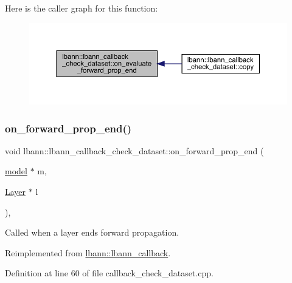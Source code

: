 Here is the caller graph for this function\+:\nopagebreak
\begin{figure}[H]
\begin{center}
\leavevmode
\includegraphics[width=350pt]{classlbann_1_1lbann__callback__check__dataset_a1223f07081d495d971cdf205f892c50d_icgraph}
\end{center}
\end{figure}
\mbox{\label{classlbann_1_1lbann__callback__check__dataset_acedc222fc108c156d089f1baa8c040af}} 
\subsubsection{\texorpdfstring{on\+\_\+forward\+\_\+prop\+\_\+end()}{on\_forward\_prop\_end()}}
{\footnotesize\ttfamily void lbann\+::lbann\+\_\+callback\+\_\+check\+\_\+dataset\+::on\+\_\+forward\+\_\+prop\+\_\+end (\begin{DoxyParamCaption}\item[{\hyperlink{classlbann_1_1model}{model} $\ast$}]{m,  }\item[{\hyperlink{classlbann_1_1Layer}{Layer} $\ast$}]{l }\end{DoxyParamCaption})\hspace{0.3cm}{\ttfamily [override]}, {\ttfamily [virtual]}}

Called when a layer ends forward propagation. 

Reimplemented from \hyperlink{classlbann_1_1lbann__callback_a5eff0a59fbce98a981d9cdd0547a3ad5}{lbann\+::lbann\+\_\+callback}.



Definition at line 60 of file callback\+\_\+check\+\_\+dataset.\+cpp.


